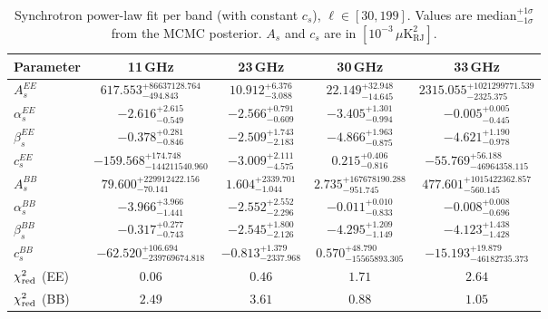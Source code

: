 \begin{table}[htbp]
\centering
\caption{Synchrotron power-law fit per band (with constant $c_s$), $\ell \in [30, 199]$. Values are median$^{+1\sigma}_{-1\sigma}$ from the MCMC posterior. $A_s$ and $c_s$ are in $[10^{-3}\,\mu\mathrm{K}^2_\mathrm{RJ}]$.}
\label{tab:sync_single_band_withc_ell30-199}
\begin{tabular}{lcccc}
\toprule
Parameter & 11\,GHz & 23\,GHz & 30\,GHz & 33\,GHz \\
\midrule
$A_s^{EE}$ & $617.553^{+86637128.764}_{-494.843}$ & $10.912^{+6.376}_{-3.088}$ & $22.149^{+32.948}_{-14.645}$ & $2315.055^{+1021299771.539}_{-2325.375}$ \\
$\alpha_s^{EE}$ & $-2.616^{+2.615}_{-0.549}$ & $-2.566^{+0.791}_{-0.609}$ & $-3.405^{+1.301}_{-0.994}$ & $-0.005^{+0.005}_{-0.445}$ \\
$\beta_s^{EE}$ & $-0.378^{+0.281}_{-0.846}$ & $-2.509^{+1.743}_{-2.183}$ & $-4.866^{+1.963}_{-0.875}$ & $-4.621^{+1.190}_{-0.978}$ \\
$c_s^{EE}$ & $-159.568^{+174.748}_{-144211540.960}$ & $-3.009^{+2.111}_{-4.575}$ & $0.215^{+0.406}_{-0.816}$ & $-55.769^{+56.188}_{-46964358.115}$ \\
\midrule
$A_s^{BB}$ & $79.600^{+229912422.156}_{-70.141}$ & $1.604^{+2339.701}_{-1.044}$ & $2.735^{+167678190.288}_{-951.745}$ & $477.601^{+1015422362.857}_{-560.145}$ \\
$\alpha_s^{BB}$ & $-3.966^{+3.966}_{-1.441}$ & $-2.552^{+2.552}_{-2.296}$ & $-0.011^{+0.010}_{-0.833}$ & $-0.008^{+0.008}_{-0.696}$ \\
$\beta_s^{BB}$ & $-0.317^{+0.277}_{-0.743}$ & $-2.545^{+1.800}_{-2.126}$ & $-4.295^{+1.209}_{-1.149}$ & $-4.123^{+1.438}_{-1.428}$ \\
$c_s^{BB}$ & $-62.520^{+106.694}_{-239769674.818}$ & $-0.813^{+1.379}_{-2337.968}$ & $0.570^{+48.790}_{-15565893.305}$ & $-15.193^{+19.879}_{-46182735.373}$ \\
\midrule
$\chi^2_{\rm red}$ (EE) & $0.06$ & $0.46$ & $1.71$ & $2.64$ \\
$\chi^2_{\rm red}$ (BB) & $2.49$ & $3.61$ & $0.88$ & $1.05$ \\
\bottomrule
\end{tabular}
\end{table}